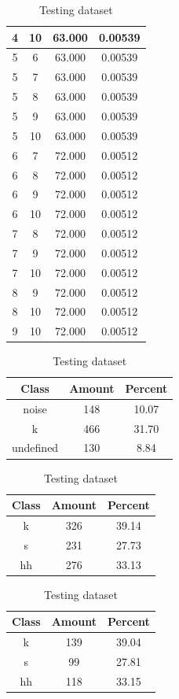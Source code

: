 \begin{table}
\begin{subtable}[h]{0.45\textwidth}
{\begin{tabular}{|c|c|c|c|}
 4 & 10 & 63.000 & 0.00539\\ \hline 
 5 & 6 & 63.000 & 0.00539\\ \hline 
 5 & 7 & 63.000 & 0.00539\\ \hline 
 5 & 8 & 63.000 & 0.00539\\ \hline 
 5 & 9 & 63.000 & 0.00539\\ \hline 
 5 & 10 & 63.000 & 0.00539\\ \hline 
 6 & 7 & 72.000 & 0.00512\\ \hline 
 6 & 8 & 72.000 & 0.00512\\ \hline 
 6 & 9 & 72.000 & 0.00512\\ \hline 
 6 & 10 & 72.000 & 0.00512\\ \hline 
 7 & 8 & 72.000 & 0.00512\\ \hline 
 7 & 9 & 72.000 & 0.00512\\ \hline 
 7 & 10 & 72.000 & 0.00512\\ \hline 
 8 & 9 & 72.000 & 0.00512\\ \hline 
 8 & 10 & 72.000 & 0.00512\\ \hline 
 9 & 10 & 72.000 & 0.00512\\ \hline 

\end{tabular}
}\label{xlsflux52}
\caption{xcsflux52}
\end{subtable}

\begin{subtable}[h]{0.45\textwidth}
\centering
\begin{tabular}{|c|c|c|}
\hline
Class & Amount & Percent\\ \hline
noise & 148 & 10.07\\ \hline
k & 466 & 31.70\\ \hline
undefined & 130 & 8.84\\ \hline
\end{tabular}
\caption{Entire dataset after stripping short sounds}
\end{subtable}
\hfill
\begin{subtable}[h]{0.45\textwidth}
\centering
\begin{tabular}{|c|c|c|}
\hline
Class & Amount & Percent\\ \hline
k & 326 & 39.14\\ \hline
s & 231 & 27.73\\ \hline
hh & 276 & 33.13\\ \hline
\end{tabular}
\caption{Training dataset}
\end{subtable}
\hfill
\begin{subtable}[h]{0.45\textwidth}
\centering
\begin{tabular}{|c|c|c|}
\hline
Class & Amount & Percent\\ \hline
k & 139 & 39.04\\ \hline
s & 99 & 27.81\\ \hline
hh & 118 & 33.15\\ \hline
\end{tabular}
\caption{Testing dataset}
\end{subtable}
\hfill


\end{table}

